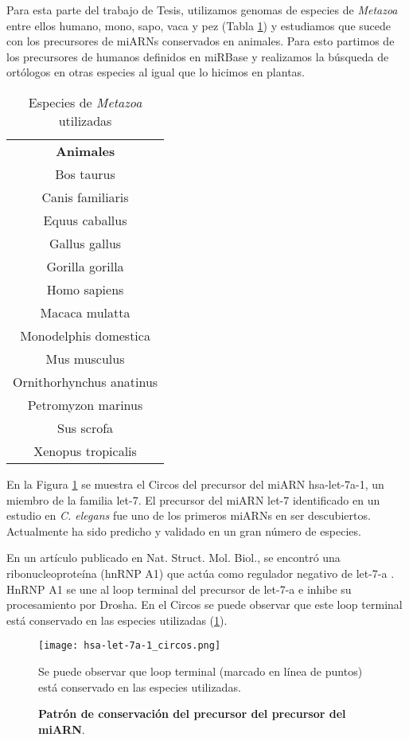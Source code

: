 Para esta parte del trabajo de Tesis, utilizamos genomas de especies de \textit{Metazoa} entre ellos humano, mono, sapo, vaca y pez (Tabla \ref{table:db_metazoa}) y estudiamos que sucede con los precursores de miARNs conservados en animales.
Para esto partimos de los precursores de humanos definidos en miRBase y realizamos la búsqueda de ortólogos en otras especies al igual que lo hicimos en plantas.

\begin{table}[!htbp]
\centering
\small
\caption{Especies de \textit{Metazoa} utilizadas}
\label{table:db_metazoa}
\begin{tabular}{c}
\rowcolor[HTML]{ECF4FF} 
\textbf{Animales}        \\
	Bos taurus               \\
	Canis familiaris         \\
	Equus caballus           \\
	Gallus gallus            \\
	Gorilla gorilla          \\
	Homo sapiens             \\
	Macaca mulatta           \\
	Monodelphis domestica    \\
	Mus musculus             \\
	Ornithorhynchus anatinus \\
	Petromyzon marinus       \\
	Sus scrofa               \\
	Xenopus tropicalis      
\end{tabular}
\end{table}

En la Figura \ref{fig:hsa-let-7a-1_circos} se muestra el Circos del precursor del miARN hsa-let-7a-1, un miembro de la familia let-7.
El precursor del miARN let-7 identificado en un estudio en \textit{C. elegans} fue uno de los primeros miARNs en ser descubiertos.
Actualmente ha sido predicho y validado en un gran número de especies.

En un artículo publicado en Nat. Struct. Mol. Biol., se encontró una ribonucleoproteína (hnRNP A1) que actúa como regulador negativo de let-7-a \citep{pmid20639884}.
HnRNP A1 se une al loop terminal del precursor de let-7-a e inhibe su procesamiento por Drosha.
En el Circos se puede observar que este loop terminal está conservado en las especies utilizadas (\ref{fig:hsa-let-7a-1_circos}).

\begin{figure}[htbp!] 
	\centering    
	\texttt{[image: hsa-let-7a-1\_circos.png]}
	\caption[Patrón de conservación del precursor del precursor del miARN hsa-let-7a-1]{
		\textbf{Patrón de conservación del precursor del precursor del miARN}.
	}
	\label{fig:hsa-let-7a-1_circos}
    Se puede observar que loop terminal (marcado en línea de puntos) está conservado en las especies utilizadas.
\end{figure}

